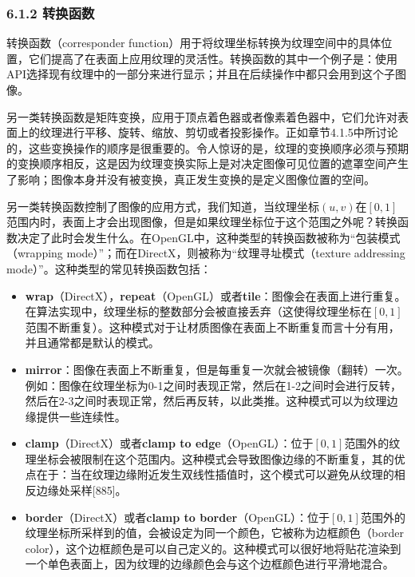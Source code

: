 \documentclass[
  paper=a4,
  ,captions=tableheading
]{scrartcl}
\providecommand{\tightlist}{%
  \setlength{\itemsep}{0pt}\setlength{\parskip}{0pt}}
\begin{document}
\subsubsection{6.1.2 转换函数}\label{ux8f6cux6362ux51fdux6570}

转换函数（corresponder
function）用于将纹理坐标转换为纹理空间中的具体位置，它们提高了在表面上应用纹理的灵活性。转换函数的其中一个例子是：使用API选择现有纹理中的一部分来进行显示；并且在后续操作中都只会用到这个子图像。

另一类转换函数是矩阵变换，应用于顶点着色器或者像素着色器中，它们允许对表面上的纹理进行平移、旋转、缩放、剪切或者投影操作。正如章节4.1.5中所讨论的，这些变换操作的顺序是很重要的。令人惊讶的是，纹理的变换顺序必须与预期的变换顺序相反，这是因为纹理变换实际上是对决定图像可见位置的遮罩空间产生了影响；图像本身并没有被变换，真正发生变换的是定义图像位置的空间。

另一类转换函数控制了图像的应用方式，我们知道，当纹理坐标\((u, v)\)在\([0,1]\)范围内时，表面上才会出现图像，但是如果纹理坐标位于这个范围之外呢？转换函数决定了此时会发生什么。在OpenGL中，这种类型的转换函数被称为``包装模式（wrapping
mode）''；而在DirectX，则被称为``纹理寻址模式（texture addressing
mode）''。这种类型的常见转换函数包括：

\begin{itemize}
  \tightlist
  \item
        \textbf{wrap}（DirectX），\textbf{repeat}（OpenGL）或者\textbf{tile}：图像会在表面上进行重复。在算法实现中，纹理坐标的整数部分会被直接丢弃（这使得纹理坐标在\([0,1]\)范围不断重复）。这种模式对于让材质图像在表面上不断重复而言十分有用，并且通常都是默认的模式。
  \item
        \textbf{mirror}：图像在表面上不断重复，但是每重复一次就会被镜像（翻转）一次。例如：图像在纹理坐标为0-1之间时表现正常，然后在1-2之间时会进行反转，然后在2-3之间时表现正常，然后再反转，以此类推。这种模式可以为纹理边缘提供一些连续性。
  \item
        \textbf{clamp}（DirectX）或者\textbf{clamp to
          edge}（OpenGL）：位于\([0,1]\)范围外的纹理坐标会被限制在这个范围内。这种模式会导致图像边缘的不断重复，其的优点在于：当在纹理边缘附近发生双线性插值时，这个模式可以避免从纹理的相反边缘处采样{[}885{]}。
  \item
        \textbf{border}（DirectX）或者\textbf{clamp to border}（OpenGL）：位于\([0,1]\)范围外的纹理坐标所采样到的值，会被设定为同一个颜色，它被称为边框颜色（border
        color），这个边框颜色是可以自己定义的。这种模式可以很好地将贴花渲染到一个单色表面上，因为纹理的边缘颜色会与这个边框颜色进行平滑地混合。
\end{itemize}
\end{document}
